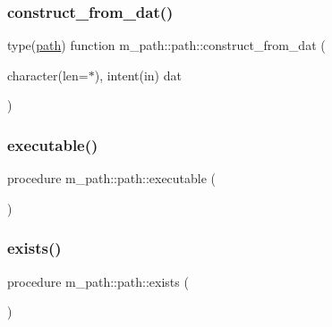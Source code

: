 \subsubsection{\texorpdfstring{construct\+\_\+from\+\_\+dat()}{construct\_from\_dat()}}
{\footnotesize\ttfamily type(\mbox{\hyperlink{structm__path_1_1path}{path}}) function m\+\_\+path\+::path\+::construct\+\_\+from\+\_\+dat (\begin{DoxyParamCaption}\item[{character(len=$\ast$), intent(in)}]{dat }\end{DoxyParamCaption})\hspace{0.3cm}{\ttfamily [private]}}

\mbox{\label{structm__path_1_1path_aef5ccbd9f037749751a4ece14ab91bc0}} 
\subsubsection{\texorpdfstring{executable()}{executable()}}
{\footnotesize\ttfamily procedure m\+\_\+path\+::path\+::executable (\begin{DoxyParamCaption}{ }\end{DoxyParamCaption})\hspace{0.3cm}{\ttfamily [private]}}

\mbox{\label{structm__path_1_1path_a008fa6fc2b63421b3c44c41ed3bf0434}} 
\subsubsection{\texorpdfstring{exists()}{exists()}}
{\footnotesize\ttfamily procedure m\+\_\+path\+::path\+::exists (\begin{DoxyParamCaption}{ }\end{DoxyParamCaption})\hspace{0.3cm}{\ttfamily [private]}}

\mbox{\label{structm__path_1_1path_a4072d4f0862ea6a73c0bcea59e356b40}} 
